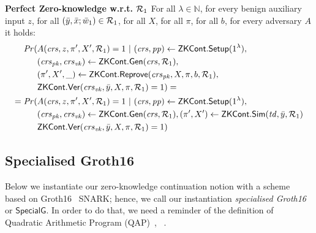 \begin{definition}[ZK Continuations]
\noindent \textbf{Perfect Zero-knowledge w.r.t. $\mathcal{R}_1$} For all $\lambda \in \mathbb{N}$, for every benign auxiliary input $z$, 
for all  $(\bar{y}, \bar{x}; \bar{w}_1) \in \mathcal{R}_1$, for all $X$, for all $\pi$, for all $b$, for every adversary $A$ it holds:
\begin{align*}
\mathit{Pr}(& A(\mathit{crs}, z, \pi', X', \mathcal{R}_1) = 1 \ | \ (\mathit{crs}, \mathit{pp}) \leftarrow {\ensuremath{\mathsf{ZKCont}}}.{\mathsf{Setup}} (1^{\lambda}), \\
                  & (\mathit{crs}_{\mathit{pk}}, \mathit{crs}_{\mathit{vk}}) \leftarrow {\ensuremath{\mathsf{ZKCont}}}.\mathsf{Gen}(\mathit{crs}, \mathcal{R}_1), \\ 
                  & (\pi', X', \_) \leftarrow {\ensuremath{\mathsf{ZKCont}}}.{\mathsf{Reprove}} (\mathit{crs}_{\mathit{pk}}, X, \pi, b, \mathcal{R}_1), \\
                  &  {\mathsf{ZKCont}}.{\mathsf{Ver}}(\mathit{crs}_{\mathit{vk}}, \bar{y}, X, \pi, \mathcal{R}_1) = 1) =  \\
= \mathit{Pr}(& A(\mathit{crs}, z, \pi', X', \mathcal{R}_1) = 1 \ | \ (\mathit{crs}, \mathit{pp}) \leftarrow {\ensuremath{\mathsf{ZKCont}}}.{\mathsf{Setup}} (1^{\lambda}), \\ 
                     & (\mathit{crs}_{\mathit{pk}}, \mathit{crs}_{\mathit{vk}}) \leftarrow {\ensuremath{\mathsf{ZKCont}}}.\mathsf{Gen}(\mathit{crs}, \mathcal{R}_1), (\pi', X') \leftarrow {\ensuremath{\mathsf{ZKCont}}}.{\mathsf{Sim}}(\mathit{td}, \bar{y}, \mathcal{R}_1) \\ 
                     &  {\mathsf{ZKCont}}.{\mathsf{Ver}}(\mathit{crs}_{\mathit{vk}}, \bar{y}, X, \pi, \mathcal{R}_1) = 1)
\end{align*}
 
\end{definition} 


\subsection{Specialised Groth16}
\label{sec:rvrf_groth16}

Below we instantiate our zero-knowledge continuation notion with a scheme based on Groth16~\cite{Groth16} SNARK;
hence, we call our instantiation \emph{specialised Groth16} or \emph{$\mathsf{SpecialG}$}. In order to do that, we need a 
reminder of the definition of Quadratic Arithmetic Program (QAP)~\cite{LegoSNARK}, ~\cite{GGPR13}.

